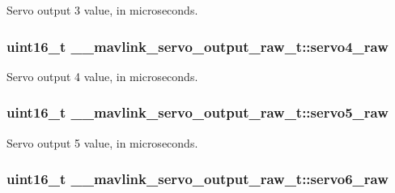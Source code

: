 Servo output 3 value, in microseconds. 

\hypertarget{struct____mavlink__servo__output__raw__t_aa9a775a58d71f44c00955771dc758012}{
\subsubsection[{servo4\+\_\+raw}]{\setlength{\rightskip}{0pt plus 5cm}uint16\+\_\+t \+\_\+\+\_\+mavlink\+\_\+servo\+\_\+output\+\_\+raw\+\_\+t\+::servo4\+\_\+raw}}\label{struct____mavlink__servo__output__raw__t_aa9a775a58d71f44c00955771dc758012}


Servo output 4 value, in microseconds. 

\hypertarget{struct____mavlink__servo__output__raw__t_a2cc4f07c7398f753b56acd16f195df6a}{
\subsubsection[{servo5\+\_\+raw}]{\setlength{\rightskip}{0pt plus 5cm}uint16\+\_\+t \+\_\+\+\_\+mavlink\+\_\+servo\+\_\+output\+\_\+raw\+\_\+t\+::servo5\+\_\+raw}}\label{struct____mavlink__servo__output__raw__t_a2cc4f07c7398f753b56acd16f195df6a}


Servo output 5 value, in microseconds. 

\hypertarget{struct____mavlink__servo__output__raw__t_a101f4294794034f15a5afe3a1e980b2e}{
\subsubsection[{servo6\+\_\+raw}]{\setlength{\rightskip}{0pt plus 5cm}uint16\+\_\+t \+\_\+\+\_\+mavlink\+\_\+servo\+\_\+output\+\_\+raw\+\_\+t\+::servo6\+\_\+raw}}\label{struct____mavlink__servo__output__raw__t_a101f4294794034f15a5afe3a1e980b2e}


